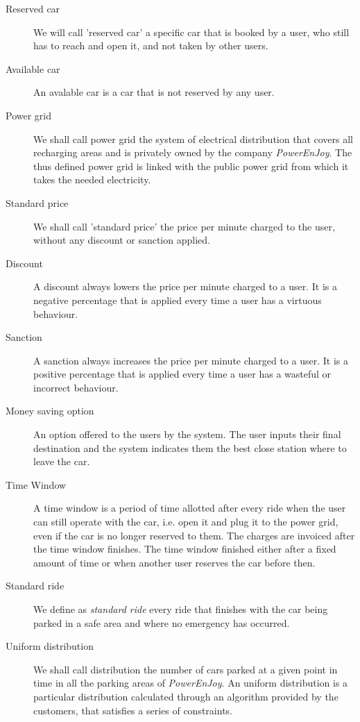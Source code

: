 \begin{description}
				\item [Reserved car] We will call 'reserved car' a specific car that is booked by a user, who still has to reach and open it, and not taken by other users.
				
				\item [Available car] An avalable car is a car that is not reserved by any user.
				
				\item[Power grid] We shall call power grid the system of electrical distribution that covers all recharging areas and is privately owned by the company \textit{PowerEnJoy}. The thus defined power grid is linked with the public power grid from which it takes the needed electricity.
				
				\item[Standard price] We shall call 'standard price' the price per minute charged to the user, without any discount or sanction applied. 
				
				\item[Discount] A discount always lowers the price per minute charged to a user. It is a negative percentage that is applied every time a user has a virtuous behaviour.
				\item[Sanction] A sanction always increases the price per minute charged to a user. It is a positive percentage that is applied every time a user has a wasteful or incorrect behaviour.
				
				\item[Money saving option] An option offered to the users by the system. The user inputs their final destination and the system indicates them the best close station where to leave the car.
				
				\item[Time Window] A time window is a period of time allotted after every ride when the user can still operate with the car, i.e. open it and plug it to the power grid, even if the car is no longer reserved to them. The charges are invoiced after the time window finishes. The time window finished either after a fixed amount of time or when another user reserves the car before then.
				
				\item[Standard ride] We define as \textit{standard ride} every ride that finishes with the car being parked in a safe area and where no emergency has occurred.
				
				\item[Uniform distribution] We shall call distribution the number of cars parked at a given point in time in all the parking areas of \textit{PowerEnJoy}. An uniform distribution is a particular distribution calculated through an algorithm provided by the customers, that satisfies a series of constraints.
			\end{description}